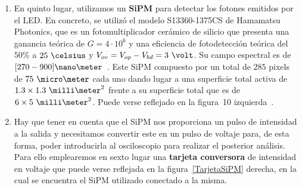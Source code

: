 \begin{enumerate}
\item {} En quinto lugar, utilizamos un \textbf{SiPM} para detectar los fotones emitidos por el LED. En concreto, se utilizó el modelo S13360-1375CS de Hamamatsu Photonics, que es un fotomultiplicador cerámico de silicio que presenta una ganancia teórica de $G=4 \cdotp 10^6$ y una eficiencia de fotodetección teórica del $50\%$ a $25~\celsius$ y $V_{ov}=V_{op}-V_{bd}=3~\volt$. Su campo espectral  es de $[270-900]\nano\meter$~\cite{datasheet SiPM}.
Este SiPM compuesto por un total de $285$ pixels de $75~\micro\meter$ cada uno dando lugar a una superficie total activa de $1.3\times1.3~\milli\meter^2$ frente a su superficie total que es de $6\times5~\milli\meter^2$. Puede verse reflejado en la figura~10 izquierda~\cite{datasheet SiPM}. 

\item {} Hay que tener en cuenta que el SiPM nos proporciona un pulso de intensidad a la salida y  necesitamos convertir este en un pulso de voltaje para, de esta forma, poder introducirla al osciloscopio para realizar el posterior análisis. Para ello emplearemos en sexto lugar una \textbf{tarjeta conversora} de intensidad en voltaje que puede verse reflejada en la figura~\ref{TarjetaSiPM} derecha, en la cual se encuentra el SiPM utilizado conectado a la misma. 


\end{enumerate}
